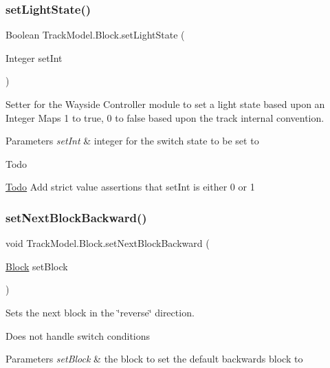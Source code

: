 \subsubsection{\texorpdfstring{set\+Light\+State()}{setLightState()}}
{\footnotesize\ttfamily Boolean Track\+Model.\+Block.\+set\+Light\+State (\begin{DoxyParamCaption}\item[{Integer}]{set\+Int }\end{DoxyParamCaption})}



Setter for the Wayside Controller module to set a light state based upon an Integer Maps 1 to true, 0 to false based upon the track internal convention. 


\begin{DoxyParams}{Parameters}
{\em set\+Int} & integer for the switch state to be set to \\
\hline
\end{DoxyParams}
\begin{DoxyRefDesc}{Todo}
\item[\hyperlink{todo__todo000001}{Todo}]Add strict value assertions that set\+Int is either 0 or 1 \end{DoxyRefDesc}
\mbox{\label{classTrackModel_1_1Block_ad0364d9a5fb2741523cca7abd356d3e9}} 
\subsubsection{\texorpdfstring{set\+Next\+Block\+Backward()}{setNextBlockBackward()}}
{\footnotesize\ttfamily void Track\+Model.\+Block.\+set\+Next\+Block\+Backward (\begin{DoxyParamCaption}\item[{\hyperlink{classTrackModel_1_1Block}{Block}}]{set\+Block }\end{DoxyParamCaption})}



Sets the next block in the \char`\"{}reverse\char`\"{} direction. 

Does not handle switch conditions 
\begin{DoxyParams}{Parameters}
{\em set\+Block} & the block to set the default backwards block to \\
\hline
\end{DoxyParams}
\mbox{\label{classTrackModel_1_1Block_a5b78735684cbae8d24cea8874f27e5bd}} 
